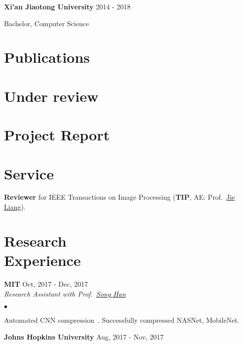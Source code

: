 \documentclass[margin,line]{res}
\newenvironment{list1}{
  \begin{list}{\ding{113}}{%
      \setlength{\itemsep}{0in}
      \setlength{\parsep}{0in} \setlength{\parskip}{0in}
      \setlength{\topsep}{0in} \setlength{\partopsep}{0in} 
      \setlength{\leftmargin}{0.17in}}}{\end{list}}
\newenvironment{list2}{
  \begin{list}{$\bullet$}{%
      \setlength{\itemsep}{0in}
      \setlength{\parsep}{0in} \setlength{\parskip}{0in}
      \setlength{\topsep}{0in} \setlength{\partopsep}{0in} 
      \setlength{\leftmargin}{0.2in}}}{\end{list}}
\begin{document}
\begin{resume}
{\bf Xi'an Jiaotong University} \hfill {2014 - 2018}\\
\vspace*{-.1in}
\begin{list1}
\item[] Bachelor, Computer Science %
\end{list1}



\section{\sc Publications}
\printbibliography[heading=none, type=inproceedings]

\section{\sc Under review}
\printbibliography[heading=none, type=article]

\section{\sc Project Report}
\printbibliography[heading=none, type=misc]


\section{\sc Service}
{\bf Reviewer} for IEEE Transactions on Image Processing (\textbf{TIP}, AE: Prof.~\href{http://www.sfu.ca/~jiel/}{Jie Liang}).


\section{\sc Research \\Experience}
{\bf MIT} \hfill {Oct, 2017 - Dec, 2017}\\%

\vspace{-.3in}
{\em Research Assistant with Prof.~\href{https://stanford.edu/~songhan/}{Song Han}}
\begin{list2}
\item Automated CNN compression~\cite{adc}. Successfully compressed NASNet, MobileNet.
\end{list2}

{\bf Johns Hopkins University} \hfill {Aug, 2017 - Nov, 2017}\\%


\end{resume}
\end{document}
